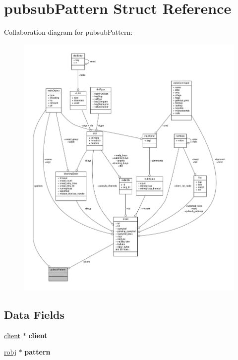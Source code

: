 \hypertarget{structpubsubPattern}{}\section{pubsub\+Pattern Struct Reference}
\label{structpubsubPattern}


Collaboration diagram for pubsub\+Pattern\+:\nopagebreak
\begin{figure}[H]
\begin{center}
\leavevmode
\includegraphics[width=350pt]{structpubsubPattern__coll__graph}
\end{center}
\end{figure}
\subsection*{Data Fields}
\begin{DoxyCompactItemize}
\item 
\mbox{\label{structpubsubPattern_a36ce52bc3e69ad3f037fd53229e8cb4c}} 
\hyperlink{structclient}{client} $\ast$ {\bfseries client}
\item 
\mbox{\label{structpubsubPattern_a16ff666d589b8b1c105eae5b430aebac}} 
\hyperlink{structredisObject}{robj} $\ast$ {\bfseries pattern}
\end{DoxyCompactItemize}


